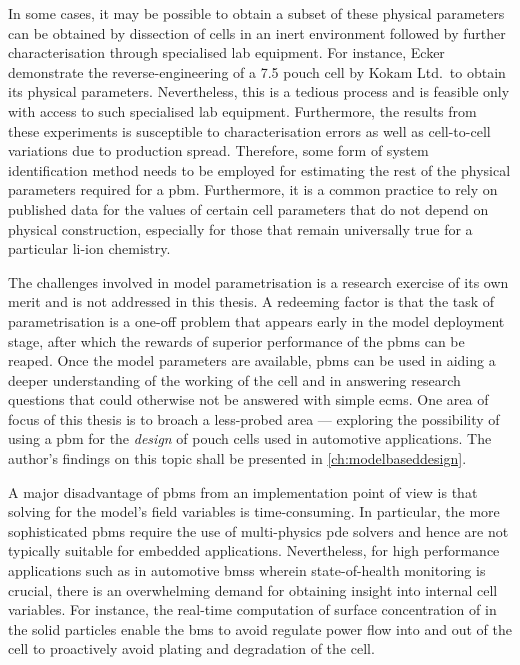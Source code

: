 In  some  cases, it  may  be  possible to  obtain  a  subset of  these  physical
parameters  can be  obtained  by dissection  of cells  in  an inert  environment
followed  by further  characterisation  through specialised  lab equipment.  For
instance, Ecker~\etal~\cite{Ecker2015} demonstrate  the reverse-engineering of a
\SI{7.5}{\amphour} pouch cell by Kokam  Ltd.\ to obtain its physical parameters.
Nevertheless, this is a tedious process and is feasible only with access to such
specialised lab  equipment. Furthermore, the  results from these  experiments is
susceptible to characterisation errors as well as cell-to-cell variations due to
production spread. Therefore, some form of system identification method needs to
be employed  for estimating the rest  of the physical parameters  required for a
\gls{pbm}.  Furthermore, it  is  a common  practice to  rely  on published  data
for  the values  of  certain cell  parameters  that do  not  depend on  physical
construction, especially for those that remain universally true for a particular
li-ion chemistry.

The challenges involved  in model parametrisation is a research  exercise of its
own merit and  is not addressed in  this thesis. A redeeming factor  is that the
task of  parametrisation is a  one-off problem that  appears early in  the model
deployment  stage,  after which  the  rewards  of  superior performance  of  the
\glspl{pbm} can be reaped. Once  the model parameters are available, \glspl{pbm}
can be used in  aiding a deeper understanding of the working of  the cell and in
answering research  questions that could  otherwise not be answered  with simple
\glspl{ecm}. One area  of focus of this  thesis is to broach  a less-probed area
--- exploring  the possibility  of using  a \gls{pbm}  for the  \emph{design} of
pouch cells used in automotive applications. The author's findings on this topic
shall be presented in \cref{ch:modelbaseddesign}.

A major disadvantage of \glspl{pbm} from an implementation point of view is that
solving for  the model's field  variables is time-consuming. In  particular, the
more  sophisticated  \glspl{pbm}  require  the use  of  multi-physics  \gls{pde}
solvers  and  hence  are  not  typically  suitable  for  embedded  applications.
Nevertheless,  for   high  performance   applications  such  as   in  automotive
\glspl{bms}  wherein   state-of-health  monitoring  is  crucial,   there  is  an
overwhelming  demand for  obtaining insight  into internal  cell variables.  For
instance, the real-time computation of surface concentration of  in the
solid particles enable  the \gls{bms} to avoid regulate power  flow into and out
of the cell to proactively avoid plating and degradation of the cell.

